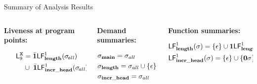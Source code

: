 \documentclass[xcolor=x11names,compress,mathserif]{beamer}
\renewcommand{\(}{\begin{columns}}
\renewcommand{\)}{\end{columns}}
\newcommand{\<}[1]{\begin{column}{#1}}
\renewcommand{\>}{\end{column}}
\begin{document}
    
\begin{frame}[t]{Summary of Analysis Results}
  \scriptsize
  \begin{columns}[c]
    \begin{column}[T]{0.33\textwidth}
      \vspace*{1.5cm}
      \centerline{\bf Liveness at program points:}
      \begin{align*}
        \mathsf{L}_{{9}}^{\mbox{\tt x}}  &=  \bar{\mathbf{1}}\mathsf{LF}_{\mathit {\mathbf{length}}}^{1}( {\mathit \sigma_{\mathit{\!all}}}) \\
        \;\;\;\;\;\;\;\;\;\;  &\cup\; \bar{\mathbf{1}}\mathsf{LF}_{\mathit {\mathbf{incr\_head}}}^{1}( {\mathit \sigma_{\mathit{\!all}}})\\ 
      \end{align*}
    \end{column}
    \begin{column}[T]{0.33\textwidth}
      \vspace*{1.5cm}
      \centerline{\bf Demand summaries:}
      \begin{align*}
        &\sigma_{\mathbf{main}} = \sigma_{all}\\
        &\sigma_{\mathbf{length}} = \sigma_{all} \cup \{\epsilon\}\\
        &\sigma_{\mathbf{incr\_head}} = \sigma_{all}\\
      \end{align*}
    \end{column}
    
    \begin{column}[T]{0.33\textwidth}
      \vspace*{1.5cm}
      \centerline{\bf Function summaries:}
      \begin{align*}
        &\mathsf{LF}_{\mathit {\mathbf{length}}}^{1}( {\mathit \sigma}) = \{\epsilon\} \cup \mathbf{1}\mathsf{LF}_{\mathit {\mathbf{length}}}^{1}( {\mathit \epsilon})\\
        &\mathsf{LF}_{\mathit {\mathbf{incr\_head}}}^{1}( {\mathit \sigma}) = \{\epsilon\} \cup \{\mathbf{0}\sigma\}\\
      \end{align*}
    \end{column}
  \end{columns}
\end{frame}
\end{document}
